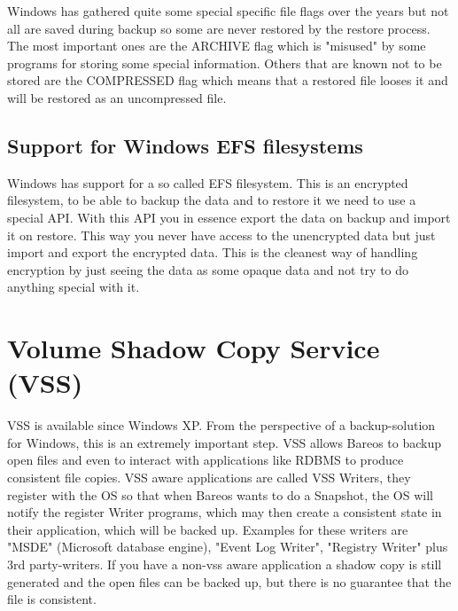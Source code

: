 
   Windows has gathered quite some special specific file
   flags over the years but not all are saved during backup so
   some are never restored by the restore process. The most
   important ones are the ARCHIVE flag which is "misused" by
   some programs for storing some special information. Others
   that are known not to be stored are the COMPRESSED flag which
   means that a restored file looses it and will be restored as
   an uncompressed file.

\subsection{Support for Windows EFS filesystems}


  Windows has support for a so called EFS
  filesystem. This is an encrypted filesystem, to be able to backup the
  data and to restore it we need to use a special API. With this API you
  in essence export the data on backup and import it on restore. This
  way you never have access to the unencrypted data but just import and
  export the encrypted data. This is the cleanest way of handling
  encryption by just seeing the data as some opaque data and not try to
  do anything special with it.



\section{Volume Shadow Copy Service (VSS)}
\label{VSS}

VSS is available since Windows XP. From the perspective of
a backup-solution for Windows, this is an extremely important step. VSS
allows Bareos to backup open files and even to interact with applications like
RDBMS to produce consistent file copies. VSS aware applications are called
VSS Writers, they register with the OS so that when Bareos wants to do a
Snapshot, the OS will notify the register Writer programs, which may then
create a consistent state in their application, which will be backed up.
Examples for these writers are "MSDE" (Microsoft database
engine), "Event Log Writer", "Registry Writer" plus 3rd
party-writers.  If you have a non-vss aware application a shadow copy is still generated
and the open files can be backed up, but there is no guarantee
that the file is consistent.

